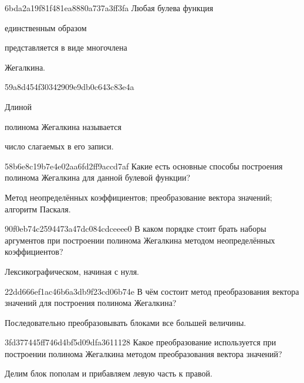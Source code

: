 \begin{note}{6bda2a19f81f481ea8880a737a3ff3fa}
    Любая булева функция \begin{icloze}{2}единственным образом\end{icloze} представляется в виде многочлена \begin{icloze}{1}Жегалкина.\end{icloze}
\end{note}

\begin{note}{59a8d454f30342909e9db0c643c83e4a}
    \begin{icloze}{2}Длиной\end{icloze} полинома Жегалкина называется \begin{icloze}{1}число слагаемых в его записи.\end{icloze}
\end{note}

\begin{note}{58b6e8c19b7e4e02aa6fd2ff9accd7af}
    Какие есть основные способы построения полинома Жегалкина для данной булевой функции?

    \begin{cloze}{1}
        Метод неопределённых коэффициентов; преобразование вектора значений; алгоритм Паскаля.
    \end{cloze}
\end{note}

\begin{note}{90f0eb74c2594473a47dc084cdceeee0}
    В каком порядке стоит брать наборы аргументов при построении полинома Жегалкина методом неопределённых коэффициентов?

    \begin{cloze}{1}
        Лексикографическом, начиная с нуля.
    \end{cloze}
\end{note}

\begin{note}{22dd666ef1ac46b6a3db9f23cd06b74e}
    В чём состоит метод преобразования вектора значений для построения полинома Жегалкина?

    \begin{cloze}{1}
        Последовательно преобразовывать блоками все большей величины.
    \end{cloze}
\end{note}

\begin{note}{3fd377445ff746d4bf5d09dfa3611128}
    Какое преобразование используется при построении полинома Жегалкина методом преобразования вектора значений?

    \begin{cloze}{1}
        Делим блок пополам и прибавляем левую часть к правой.
    \end{cloze}
\end{note}

